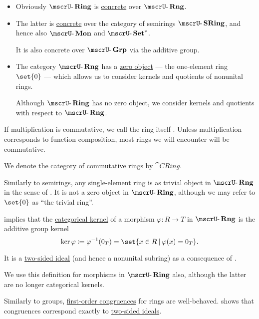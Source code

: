 \begin{definition}
\begin{thmenum}
    \begin{itemize}
      \item Obviously \( \ucat{Ring} \) is \hyperref[def:concrete_category]{concrete} over \( \ucat{Rng} \).
      \item The latter is \hyperref[def:concrete_category]{concrete} over the category of semirings \hyperref[def:semiring/category]{\( \ucat{SRing} \)}, and hence also \hyperref[def:monoid/category]{\( \ucat{Mon} \)} and \hyperref[def:pointed_set/category]{\( \ucat{Set}^* \)}.

      It is also concrete over \hyperref[def:group/category]{\( \ucat{Grp} \)} via the additive group.

      \item The category \( \ucat{Rng} \) has a \hyperref[def:universal_objects/zero]{zero object} --- the one-element ring \( \set{ 0 } \) --- which allows us to consider kernels and quotients of nonunital rings.

      Although \( \ucat{Ring} \) has no zero object, we consider kernels and quotients with respect to \( \ucat{Rng} \).
    \end{itemize}

     If multiplication is commutative, we call the ring itself . Unless multiplication corresponds to function composition, most rings we will encounter will be commutative.

    We denote the category of commutative rings by \( \cat{CRing} \).

     Similarly to semirings, any single-element ring is as trivial object in \( \ucat{Rng} \) in the sense of . It is not a zero object in \( \ucat{Ring} \), although we may refer to \( \set{ 0 } \) as \enquote{the trivial ring}.

      implies that the \hyperref[def:zero_morphisms/kernel]{categorical kernel} of a morphism \( \varphi: R \to T \) in \( \ucat{Rng} \) is the additive group kernel
    \begin{equation*}
      \ker \varphi \coloneqq \varphi^{-1}(0_T) = \set{ x \in R \given \varphi(x) = 0_T }.
    \end{equation*}

    It is a \hyperref[def:semiring_ideal]{two-sided ideal} (and hence a nonunital subring) as a consequence of .

    We use this definition for morphisms in \( \ucat{Ring} \) also, although the latter are no longer categorical kernels.

     Similarly to groups, \hyperref[def:first_order_congruence]{first-order congruences} for rings are well-behaved.  shows that congruences correspond exactly to \hyperref[def:semiring_ideal]{two-sided ideals}.
  \end{thmenum}
\end{definition}

